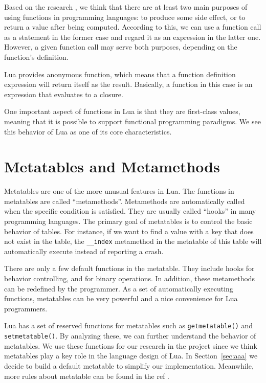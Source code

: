 Based on the research \cite{PIL}, we think that there are at least two main purposes of using functions in programming languages: to produce some side effect, or to return a value after being computed. According to this, we can use a function call as a statement in the former case and regard it as an expression in the latter one. However, a given function call may serve both purposes, depending on the function's definition.

Lua provides anonymous function, which means that a function definition expression will return itself as the result. Basically, a function in this case is an expression that evaluates to a closure.

One important aspect of functions in Lua is that they are first-class values,
meaning that it is possible to support functional programming paradigms.
We see this behavior of Lua as one of its core characteristics.

\section{Metatables and Metamethods}
Metatables are one of the more unusual features in Lua. The functions in metatables are called ``metamethods''. Metamethods are automatically called when the specific condition is satisfied. They are usually called ``hooks'' in many programming languages. The primary goal of metatables is to control the basic behavior of tables. For instance, if we want to find a value with a key that does not exist in the table, the {\tt \_\_index} metamethod in the metatable of this table will automatically execute instead of reporting a crash.

There are only a few default functions in the metatable. They include hooks for behavior controlling, and for binary operations. In addition, these metamethods can be redefined by the programmer. As a set of automatically executing functions, metatables can be very powerful and a nice convenience for Lua programmers.

Lua has a set of reserved functions for metatables such as {\tt getmetatable()} and {\tt setmetatable()}. By analyzing these, we can further understand the behavior of metatables. We use these functions for our research in the project since we think metatables play a key role in the language design of Lua.
In Section~\ref{sec:aaa} we decide to build a default metatable to simplify our implementation. Meanwhile, more rules about metatable can be found in the ref \cite{LRM}.

